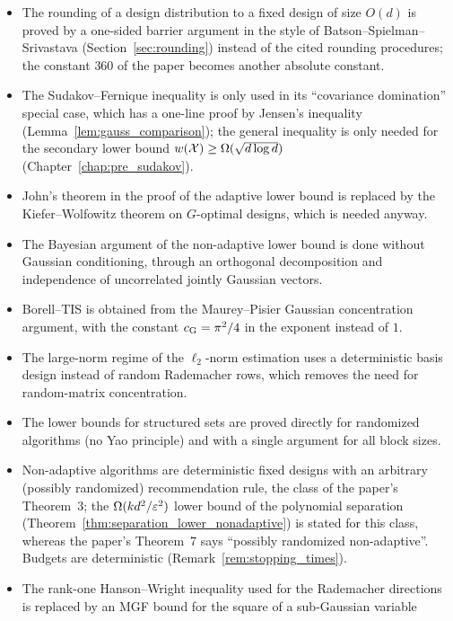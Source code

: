 \begin{itemize}
  \item The rounding of a design distribution to a fixed design of size $O(d)$ is proved by
        a one-sided barrier argument in the style of Batson--Spielman--Srivastava
        (Section~\ref{sec:rounding}) instead of the cited rounding procedures; the constant
        $360$ of the paper becomes another absolute constant.
  \item The Sudakov--Fernique inequality is only used in its ``covariance domination''
        special case, which has a one-line proof by Jensen's inequality
        (Lemma~\ref{lem:gauss_comparison}); the general inequality is only needed for the
        secondary lower bound $w(\mathcal{X}) \ge \Omega(\sqrt{d \log d})$
        (Chapter~\ref{chap:pre_sudakov}).
  \item John's theorem in the proof of the adaptive lower bound is replaced by the
        Kiefer--Wolfowitz theorem on $G$-optimal designs, which is needed anyway.
  \item The Bayesian argument of the non-adaptive lower bound is done without Gaussian
        conditioning, through an orthogonal decomposition and independence of uncorrelated
        jointly Gaussian vectors.
  \item Borell--TIS is obtained from the Maurey--Pisier Gaussian concentration argument,
        with the constant $c_{\mathrm{G}} = \pi^2/4$ in the exponent instead of $1$.
  \item The large-norm regime of the $\ell_2$-norm estimation uses a deterministic
        basis design instead of random Rademacher rows, which removes the need for
        random-matrix concentration.
  \item The lower bounds for structured sets are proved directly for randomized algorithms
        (no Yao principle) and with a single argument for all block sizes.
  \item Non-adaptive algorithms are deterministic fixed designs with an arbitrary (possibly
        randomized) recommendation rule, the class of the paper's Theorem~3; the
        $\Omega(kd^2/\varepsilon^2)$ lower bound of the polynomial separation
        (Theorem~\ref{thm:separation_lower_nonadaptive}) is stated for this class, whereas the
        paper's Theorem~7 says ``possibly randomized non-adaptive''. Budgets are
        deterministic (Remark~\ref{rem:stopping_times}).
  \item The rank-one Hanson--Wright inequality used for the Rademacher directions is replaced
        by an MGF bound for the square of a sub-Gaussian variable

\end{itemize}
